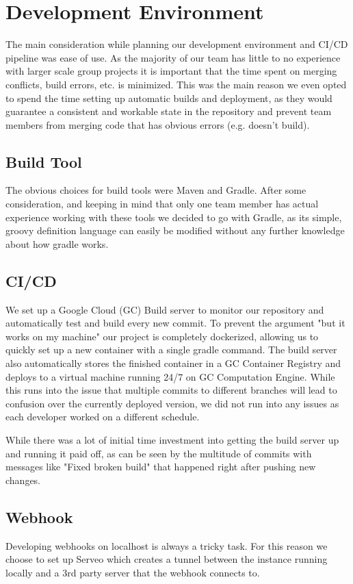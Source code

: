 \documentclass[12pt, a4paper]{article}
\begin{document}
\section{Development Environment}
The main consideration while planning our development environment and CI/CD pipeline was ease of use. As the majority of our team has little to no experience with larger scale group projects it is important that the time spent on merging conflicts, build errors, etc. is minimized. This was the main reason we even opted to spend the time setting up automatic builds and deployment, as they would guarantee a consistent and workable state in the repository and prevent team members from merging code that has obvious errors (e.g. doesn't build).

\subsection{Build Tool} 
The obvious choices for build tools were Maven and Gradle. After some consideration, and keeping in mind that only one team member has actual experience working with these tools we decided to go with Gradle, as its simple, groovy definition language can easily be modified without any further knowledge about how gradle works.
\subsection{CI/CD}
We set up a Google Cloud (GC) Build server to monitor our repository and automatically test and build every new commit. To prevent the argument "but it works on my machine" our project is completely dockerized, allowing us to quickly set up a new container with a single gradle command. The build server also automatically stores the finished container in a GC Container Registry and deploys to a virtual machine running 24/7 on GC Computation Engine. While this runs into the issue that multiple commits to different branches will lead to confusion over the currently deployed version, we did not run into any issues as each developer worked on a different schedule.

While there was a lot of initial time investment into getting the build server up and running it paid off, as can be seen by the multitude of commits with messages like "Fixed broken build" that happened right after pushing new changes.
\subsection{Webhook}
Developing webhooks on localhost is always a tricky task. For this reason we choose to set up Serveo which creates a tunnel between the instance running locally and a 3rd party server that the webhook connects to.
\end{document}
